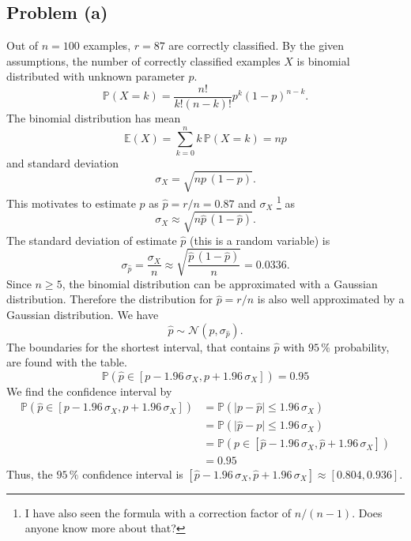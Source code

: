 \subsection*{Problem (a)}

Out of $n=100$ examples, $r=87$ are correctly classified. By the
given assumptions, the number of correctly classified examples $X$
is binomial distributed with unknown parameter $p$.
\[
\mathbb{P}(X=k)=\frac{n!}{k!(n-k)!}p^{k}(1-p)^{n-k}.
\]
The binomial distribution has mean
\[
\mathbb{E}(X)=\sum_{k=0}^{n}k\,\mathbb{P}(X=k)=np
\]
and standard deviation 
\[
\sigma_{X}=\sqrt{np\,(1-p)}.
\]
This motivates to estimate $p$ as $\hat{p}=r/n=0.87$ and $\sigma_{X}$%
\footnote{I have also seen the formula with a correction factor of $n/(n-1)$.
Does anyone know more about that?%
} as 
\[
\sigma_{X}\approx\sqrt{n\hat{p}\,(1-\hat{p})}.
\]
 The standard deviation of estimate $\hat{p}$ (this is a random variable)
is
\[
\sigma_{\hat{p}}=\frac{\sigma_{X}}{n}\approx\sqrt{\frac{\hat{p}\,(1-\hat{p})}{n}}=0.0336.
\]
Since $n\geq5$, the binomial distribution can be approximated with
a Gaussian distribution. Therefore the distribution for $\hat{p}=r/n$
is also well approximated by a Gaussian distribution. We have
\[
\hat{p}\sim\mathcal{N}(p,\sigma_{\hat{p}}).
\]
The boundaries for the shortest interval, that contains $\hat{p}$
with $95\,\%$ probability, are found with the table.
\[
\mathbb{P}\left(\hat{p}\in\left[p-1.96\,\sigma_{X},p+1.96\,\sigma_{X}\right]\right)=0.95
\]
We find the confidence interval by 
\begin{align*}
\mathbb{P}\left(\hat{p}\in\left[p-1.96\,\sigma_{X},p+1.96\,\sigma_{X}\right]\right) & =\mathbb{P}\left(\vert p-\hat{p}\vert\leq1.96\,\sigma_{X}\right)\\
 & =\mathbb{P}\left(\vert\hat{p}-p\vert\leq1.96\,\sigma_{X}\right)\\
 & =\mathbb{P}\left(p\in\left[\hat{p}-1.96\,\sigma_{X},\hat{p}+1.96\,\sigma_{X}\right]\right)\\
 & =0.95
\end{align*}
Thus, the $95\,\%$ confidence interval is $\left[\hat{p}-1.96\,\sigma_{X},\hat{p}+1.96\,\sigma_{X}\right]\approx\left[0.804,0.936\right]$.